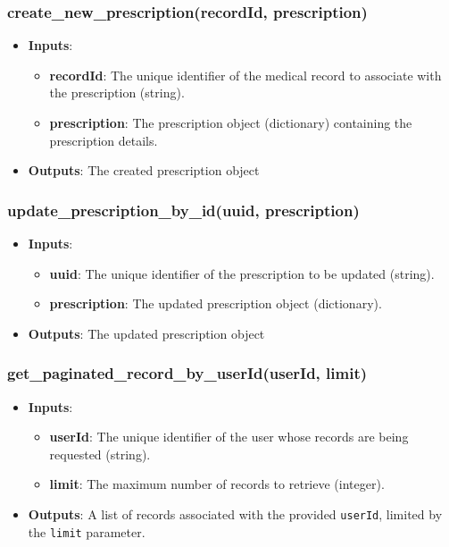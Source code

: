 \documentclass[12pt, titlepage]{article}
\begin{document}
\subsubsection{create\_new\_prescription(recordId, prescription)}
\begin{itemize}
    \item \textbf{Inputs}:
        \begin{itemize}
            \item \textbf{recordId}: The unique identifier of the medical record to associate with the prescription (string).
            \item \textbf{prescription}: The prescription object (dictionary) containing the prescription details.
        \end{itemize}
    \item \textbf{Outputs}: The created prescription object
\end{itemize}

\subsubsection{update\_prescription\_by\_id(uuid, prescription)}
\begin{itemize}
    \item \textbf{Inputs}:
        \begin{itemize}
            \item \textbf{uuid}: The unique identifier of the prescription to be updated (string).
            \item \textbf{prescription}: The updated prescription object (dictionary).
        \end{itemize}
    \item \textbf{Outputs}: The updated prescription object
\end{itemize}

\subsubsection{get\_paginated\_record\_by\_userId(userId, limit)}
\begin{itemize}
    \item \textbf{Inputs}:
        \begin{itemize}
            \item \textbf{userId}: The unique identifier of the user whose records are being requested (string).
            \item \textbf{limit}: The maximum number of records to retrieve (integer).
        \end{itemize}
    \item \textbf{Outputs}: A list of records associated with the provided \texttt{userId}, limited by the \texttt{limit} parameter.
\end{itemize}
\end{document}
